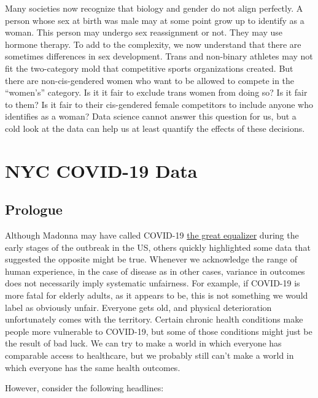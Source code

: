 \documentclass[
  openany]{book}
\begin{document}
Many societies now recognize that biology and gender do not align perfectly. A person whose sex at birth was male may at some point grow up to identify as a woman. This person may undergo sex reassignment or not. They may use hormone therapy. To add to the complexity, we now understand that there are sometimes differences in sex development. Trans and non-binary athletes may not fit the two-category mold that competitive sports organizations created. But there are non-cis-gendered women who want to be allowed to compete in the ``women's'' category. Is it it fair to exclude trans women from doing so? Is it fair to them? Is it fair to their cis-gendered female competitors to include anyone who identifies as a woman? Data science cannot answer this question for us, but a cold look at the data can help us at least quantify the effects of these decisions.

\hypertarget{nyc-covid-19-data}{%
\chapter{NYC COVID-19 Data}\label{nyc-covid-19-data}}

\hypertarget{prologue}{%
\section*{Prologue}\label{prologue}}

Although Madonna may have called COVID-19 \href{https://pagesix.com/2020/03/22/madonna-calls-coronavirus-the-great-equalizer-in-bizarre-bathtub-video/}{the great equalizer} during the early stages of the outbreak in the US, others quickly highlighted some data that suggested the opposite might be true. Whenever we acknowledge the range of human experience, in the case of disease as in other cases, variance in outcomes does not necessarily imply systematic unfairness. For example, if COVID-19 is more fatal for elderly adults, as it appears to be, this is not something we would label as obviously unfair. Everyone gets old, and physical deterioration unfortunately comes with the territory. Certain chronic health conditions make people more vulnerable to COVID-19, but some of those conditions might just be the result of bad luck. We can try to make a world in which everyone has comparable access to healthcare, but we probably still can't make a world in which everyone has the same health outcomes.

However, consider the following headlines:
\end{document}
